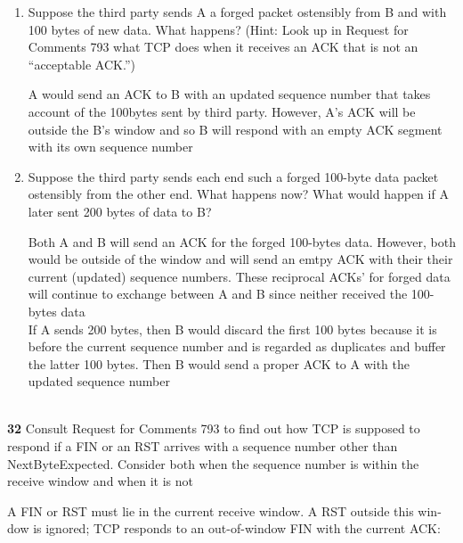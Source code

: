 \documentclass[11pt]{article}
\begin{document}
\begin{enumerate}
    \item Suppose the third party sends A a forged packet ostensibly from B and with 100 bytes of new data. What happens? (Hint: Look up in Request for Comments 793 what TCP does when it receives an ACK that is not an “acceptable ACK.”)
    \begin{solution}
        A would send an ACK to B with an updated sequence number that takes account of the 100bytes sent by third party. However, A's ACK will be outside the B's window and so B will respond with an empty ACK segment with its own sequence number 
    \end{solution}
    \item Suppose the third party sends each end such a forged 100-byte data packet ostensibly from the other end. What happens now? What would happen if A later sent 200 bytes of data to B?
    \begin{solution}
        Both A and B will send an ACK for the forged 100-bytes data. However, both would be outside of the window and will send an emtpy ACK with their their current (updated) sequence numbers. These reciprocal ACKs' for forged data will continue to exchange between A and B since neither received the 100-bytes data \\
        If A sends 200 bytes, then B would discard the first 100 bytes because it is before the current sequence number and is regarded as duplicates and buffer the latter 100 bytes. Then B would send a proper ACK to A with the updated sequence number
    \end{solution}
\end{enumerate}


$ $\\
\textbf{32} Consult Request for Comments 793 to find out how TCP is supposed to respond if a FIN or an RST arrives with a sequence number other than NextByteExpected. Consider both when the sequence number is within the receive window and when it is not

A FIN or RST must lie in the current receive window. A RST outside this win- dow is ignored; TCP responds to an out-of-window FIN with the current ACK:
\end{document}
